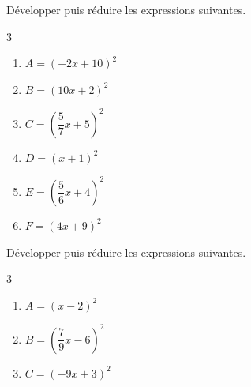 {%
\begin{Exercice} %
Développer puis réduire les expressions suivantes.
\vspace{-0.5cm}
\begin{multicols}{3}
\begin{enumerate}[itemsep=1em,label={}]
	\item \begin{minipage}[t]{\linewidth}$A=\left(-2x+10\right)^2$\end{minipage}
	\item \begin{minipage}[t]{\linewidth}$B=\left(10x+2\right)^2$\end{minipage}
	\item \begin{minipage}[t]{\linewidth}$C=\left(\dfrac{5}{7}x+5\right)^2$\end{minipage}
	\item \begin{minipage}[t]{\linewidth}$D=\left(x+1\right)^2$\end{minipage}
	\item \begin{minipage}[t]{\linewidth}$E=\left(\dfrac{5}{6}x+4\right)^2$\end{minipage}
	\item \begin{minipage}[t]{\linewidth}$F=\left(4x+9\right)^2$\end{minipage}
\end{enumerate}
\end{multicols}
\end{Exercice}
\newpage
\begin{Exercice}%
Développer puis réduire les expressions suivantes.
\begin{multicols}{3}
\begin{enumerate}[itemsep=1em,label={}]
	\item \begin{minipage}[t]{\linewidth}$A=\left(x-2\right)^2$\end{minipage}
	\item \begin{minipage}[t]{\linewidth}$B=\left(\dfrac{7}{9}x-6\right)^2$\end{minipage}
	\item \begin{minipage}[t]{\linewidth}$C=\left(-9x+3\right)^2$\end{minipage}

\end{enumerate}
\end{multicols}
\end{Exercice}}
